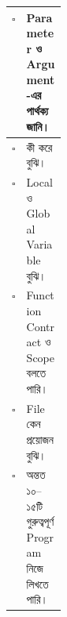 \begin{tabularx}{\linewidth}{
|C{0.08\linewidth}
|Y|
}
\(\square\)
&
Parameter ও Argument-এর পার্থক্য জানি।
\\
\hline

\(\square\)
&
 কী করে বুঝি।
\\
\hline

\(\square\)
&
Local ও Global Variable বুঝি।
\\
\hline

\(\square\)
&
Function Contract ও Scope বলতে পারি।
\\
\hline

\(\square\)
&
File কেন প্রয়োজন বুঝি।
\\
\hline

\(\square\)
&
অন্তত ১০--১৫টি গুরুত্বপূর্ণ Program নিজে লিখতে পারি।
\\
\hline

\end{tabularx}


